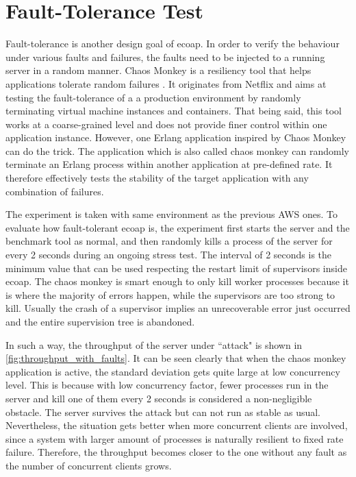 \section{Fault-Tolerance Test}

Fault-tolerance is another design goal of ecoap. In order to verify the behaviour under various faults and failures, the faults need to be injected to a running server in a random manner. Chaos Monkey is a resiliency tool that helps applications tolerate random failures \cite{chaos_monkey_netflix}. It originates from Netflix and aims at testing the fault-tolerance of a a production environment by randomly terminating virtual machine instances and containers. That being said, this tool works at a coarse-grained level and does not provide finer control within one application instance. However, one Erlang application inspired by Chaos Monkey can do the trick. The application which is also called chaos monkey \cite{chaos_monkey_erl} can randomly terminate an Erlang process within another application at pre-defined rate. It therefore effectively tests the stability of the target application with any combination of failures. 

The experiment is taken with same environment as the previous AWS ones. To evaluate how fault-tolerant ecoap is, the experiment first starts the server and the benchmark tool as normal, and then randomly kills a process of the server for every 2 seconds during an ongoing stress test. The interval of 2 seconds is the minimum value that can be used respecting the restart limit of supervisors inside ecoap. The chaos monkey is smart enough to only kill worker processes because it is where the majority of errors happen, while the supervisors are too strong to kill. Usually the crash of a supervisor implies an unrecoverable error just occurred and the entire supervision tree is abandoned. 

In such a way, the throughput of the server under ``attack" is shown in \autoref{fig:throughput_with_faults}. It can be seen clearly that when the chaos monkey application is active, the standard deviation gets quite large at low concurrency level. This is because with low concurrency factor, fewer processes run in the server and kill one of them every 2 seconds is considered a non-negligible obstacle. The server survives the attack but can not run as stable as usual. Nevertheless, the situation gets better when more concurrent clients are involved, since a system with larger amount of processes is naturally resilient to fixed rate failure. Therefore, the throughput becomes closer to the one without any fault as the number of concurrent clients grows. 

